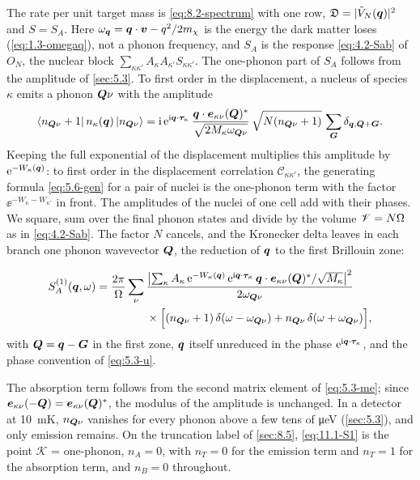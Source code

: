 The rate per unit target mass is \cref{eq:8.2-spectrum} with one row, $\mathfrak{D} = |\tilde V_N(\bm{q})|^2$ and $S = S_A$. Here $\omega_{\bm{q}} = \bm{q}\cdot\bm{v} - q^2/2m_{\chi}$ is the energy the dark matter loses (\cref{eq:1.3-omegaq}), not a phonon frequency, and $S_A$ is the response \cref{eq:4.2-Sab} of $O_N$, the nuclear block $\sum_{\kappa\kappa'}A_\kappa A_{\kappa'}S_{\kappa\kappa'}$. The one-phonon part of $S_A$ follows from the amplitude of \cref{sec:5.3}. To first order in the displacement, a nucleus of species $\kappa$ emits a phonon $\bm{Q}\nu$ with the amplitude
\begin{equation*}
  \langle n_{\bm{Q}\nu} + 1|\,n_\kappa(\bm{q})\,|n_{\bm{Q}\nu}\rangle = \mathrm{i}\,\mathrm{e}^{\mathrm{i}\bm{q}\cdot\bm{\tau}_\kappa}\,\frac{\bm{q}\cdot\bm{e}_{\kappa\nu}(\bm{Q})^*}{\sqrt{2M_\kappa\omega_{\bm{Q}\nu}}}\,\sqrt{N(n_{\bm{Q}\nu} + 1)}\,\sum_{\bm{G}}\delta_{\bm{q},\bm{Q} + \bm{G}} .
\end{equation*}
Keeping the full exponential of the displacement multiplies this amplitude by $\mathrm{e}^{-W_\kappa(\bm{q})}$: to first order in the displacement correlation $\mathcal{C}_{\kappa\kappa'}$, the generating formula \cref{eq:5.6-gen} for a pair of nuclei is the one-phonon term with the factor $\ee^{-W_\kappa - W_{\kappa'}}$ in front. The amplitudes of the nuclei of one cell add with their phases. We square, sum over the final phonon states and divide by the volume $\mathscr{V} = N\Omega$ as in \cref{eq:4.2-Sab}. The factor $N$ cancels, and the Kronecker delta leaves in each branch one phonon wavevector $\bm{Q}$, the reduction of $\bm{q}$ to the first Brillouin zone:
\begin{keyresult}
\begin{equation}
  \begin{aligned}
  S^{(1)}_A(\bm{q},\omega) = \frac{2\pi}{\Omega}\sum_\nu{}&\frac{\bigl|\sum_\kappa A_\kappa\,\mathrm{e}^{-W_\kappa(\bm{q})}\,\mathrm{e}^{\mathrm{i}\bm{q}\cdot\bm{\tau}_\kappa}\,\bm{q}\cdot\bm{e}_{\kappa\nu}(\bm{Q})^*/\sqrt{M_\kappa}\bigr|^2}{2\omega_{\bm{Q}\nu}} \\
  &\times\Bigl[(n_{\bm{Q}\nu} + 1)\,\delta(\omega - \omega_{\bm{Q}\nu}) + n_{\bm{Q}\nu}\,\delta(\omega + \omega_{\bm{Q}\nu})\Bigr] ,
  \end{aligned}
  \label{eq:11.1-S1}
\end{equation}
with $\bm{Q} = \bm{q} - \bm{G}$ in the first zone, $\bm{q}$ itself unreduced in the phase $\mathrm{e}^{\mathrm{i}\bm{q}\cdot\bm{\tau}_\kappa}$, and the phase convention of \cref{eq:5.3-u}.
\end{keyresult}
\noindent The absorption term follows from the second matrix element of \cref{eq:5.3-me}; since $\bm{e}_{\kappa\nu}(-\bm{Q}) = \bm{e}_{\kappa\nu}(\bm{Q})^*$, the modulus of the amplitude is unchanged. In a detector at \SI{10}{mK}, $n_{\bm{Q}\nu}$ vanishes for every phonon above a few tens of \si{\micro eV} (\cref{sec:5.3}), and only emission remains. On the truncation label of \cref{sec:8.5}, \cref{eq:11.1-S1} is the point $\mathcal{K}$ = one-phonon, $n_A = 0$, with $n_T = 0$ for the emission term and $n_T = 1$ for the absorption term, and $n_B = 0$ throughout.

